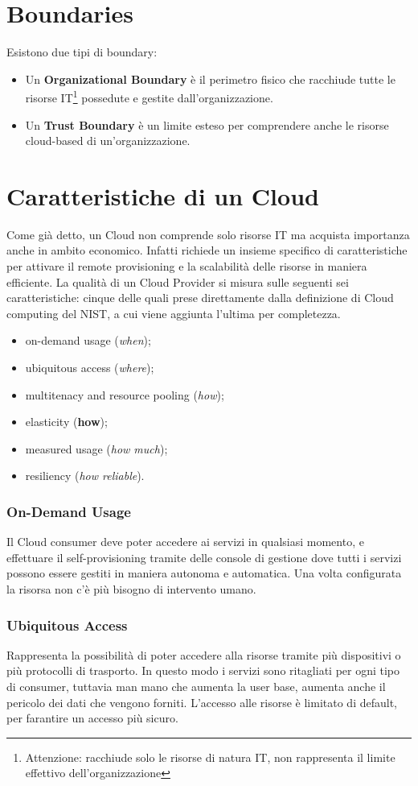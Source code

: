 \section{Boundaries}
Esistono due tipi di boundary:
\begin{itemize}
    \item Un \textbf{Organizational Boundary} è il perimetro fisico che racchiude tutte le risorse IT\footnote{Attenzione: racchiude solo le risorse di natura IT, non rappresenta il limite effettivo dell'organizzazione} possedute e gestite dall'organizzazione.
    \item Un \textbf{Trust Boundary} è un limite esteso per comprendere anche le risorse cloud-based di un'organizzazione.
\end{itemize}
\section{Caratteristiche di un Cloud}
Come già detto, un Cloud non comprende solo risorse IT ma acquista importanza anche in ambito economico. Infatti richiede un insieme specifico di caratteristiche per attivare il remote provisioning e la scalabilità delle risorse in maniera efficiente. La qualità di un Cloud Provider si misura sulle seguenti sei caratteristiche: cinque delle quali prese direttamente dalla definizione di Cloud computing del NIST, a cui viene aggiunta l'ultima per completezza.
\begin{itemize}
    \item on-demand usage (\textit{when});
    \item ubiquitous access (\textit{where});
    \item multitenacy and resource pooling (\textit{how});
    \item elasticity (\textbf{how});
    \item measured usage (\textit{how much});
    \item resiliency (\textit{how reliable}).
\end{itemize}
\subsubsection{On-Demand Usage}
Il Cloud consumer deve poter accedere ai servizi in qualsiasi momento, e effettuare il self-provisioning tramite delle console di gestione dove tutti i servizi possono essere gestiti in maniera autonoma e automatica. Una volta configurata la risorsa non c'è più bisogno di intervento umano.
\subsubsection{Ubiquitous Access}
Rappresenta la possibilità di poter accedere alla risorse tramite più dispositivi o più protocolli di trasporto. In questo modo i servizi sono ritagliati per ogni tipo di consumer, tuttavia man mano che aumenta la user base, aumenta anche il pericolo dei dati che vengono forniti. L'accesso alle risorse è limitato di default, per farantire un accesso più sicuro.
